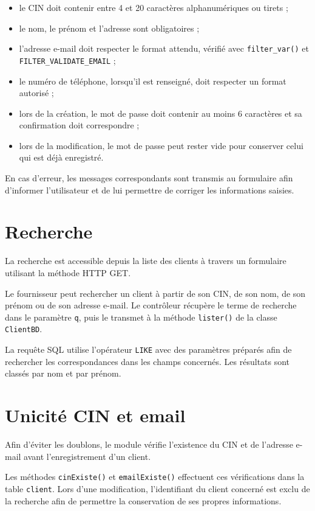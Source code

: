 \begin{itemize}[leftmargin=*]
    \item le CIN doit contenir entre 4 et 20 caractères alphanumériques ou tirets ;
    \item le nom, le prénom et l'adresse sont obligatoires ;
    \item l'adresse e-mail doit respecter le format attendu, vérifié avec \texttt{filter\_var()} et \texttt{FILTER\_VALIDATE\_EMAIL} ;
    \item le numéro de téléphone, lorsqu'il est renseigné, doit respecter un format autorisé ;
    \item lors de la création, le mot de passe doit contenir au moins 6 caractères et sa confirmation doit correspondre ;
    \item lors de la modification, le mot de passe peut rester vide pour conserver celui qui est déjà enregistré.
\end{itemize}

En cas d'erreur, les messages correspondants sont transmis au formulaire afin d'informer l'utilisateur et de lui permettre de corriger les informations saisies.

\section{Recherche}

La recherche est accessible depuis la liste des clients à travers un formulaire utilisant la méthode HTTP GET.

Le fournisseur peut rechercher un client à partir de son CIN, de son nom, de son prénom ou de son adresse e-mail. Le contrôleur récupère le terme de recherche dans le paramètre \texttt{q}, puis le transmet à la méthode \texttt{lister()} de la classe \texttt{ClientBD}.

La requête SQL utilise l'opérateur \texttt{LIKE} avec des paramètres préparés afin de rechercher les correspondances dans les champs concernés. Les résultats sont classés par nom et par prénom.

\section{Unicité CIN et email}

Afin d'éviter les doublons, le module vérifie l'existence du CIN et de l'adresse e-mail avant l'enregistrement d'un client.

Les méthodes \texttt{cinExiste()} et \texttt{emailExiste()} effectuent ces vérifications dans la table \texttt{client}. Lors d'une modification, l'identifiant du client concerné est exclu de la recherche afin de permettre la conservation de ses propres informations.

